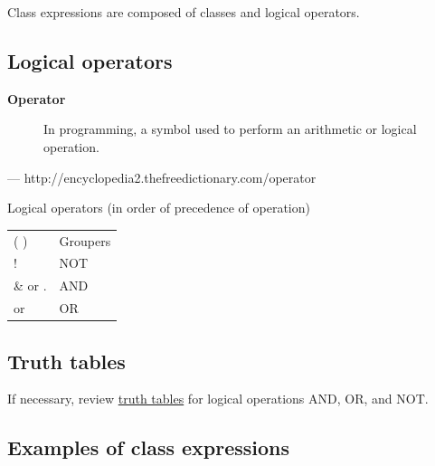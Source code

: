Class expressions are composed of classes and logical operators.





\subsection{Logical operators}

\begin{description}
\item[\textbf{Operator}] In programming, a symbol used to perform an arithmetic or logical operation.
\end{description}

--- http://encyclopedia2.thefreedictionary.com/operator

Logical operators (in order of precedence of operation)

\begin{longtable}{|l|l|}
\hline
( ) & Groupers\\
! & NOT\\
\& or . & AND\\
\textbar{} or \textbar{}\textbar{} & OR\\
\hline
\end{longtable}





\subsection{Truth tables}

If necessary, review \href{https://en.wikipedia.org/wiki/Truth_table#Logical_conjunction_.28AND.29}{truth tables} for logical operations AND, OR, and NOT.





\subsection{Examples of class expressions}

